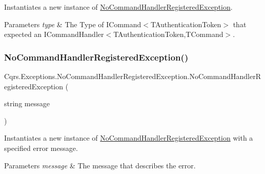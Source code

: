 Instantiates a new instance of \hyperlink{classCqrs_1_1Exceptions_1_1NoCommandHandlerRegisteredException}{No\+Command\+Handler\+Registered\+Exception}. 


\begin{DoxyParams}{Parameters}
{\em type} & The Type of I\+Command$<$\+T\+Authentication\+Token$>$ that expected an I\+Command\+Handler$<$\+T\+Authentication\+Token,\+T\+Command$>$.\\
\hline
\end{DoxyParams}
\mbox{\label{classCqrs_1_1Exceptions_1_1NoCommandHandlerRegisteredException_a489f12858f990ea6a84f268e7744ab84_a489f12858f990ea6a84f268e7744ab84}} 
\subsubsection{\texorpdfstring{No\+Command\+Handler\+Registered\+Exception()}{NoCommandHandlerRegisteredException()}\hspace{0.1cm}{\footnotesize\ttfamily [2/2]}}
{\footnotesize\ttfamily Cqrs.\+Exceptions.\+No\+Command\+Handler\+Registered\+Exception.\+No\+Command\+Handler\+Registered\+Exception (\begin{DoxyParamCaption}\item[{string}]{message }\end{DoxyParamCaption})\hspace{0.3cm}{\ttfamily [protected]}}



Instantiates a new instance of \hyperlink{classCqrs_1_1Exceptions_1_1NoCommandHandlerRegisteredException}{No\+Command\+Handler\+Registered\+Exception} with a specified error message. 


\begin{DoxyParams}{Parameters}
{\em message} & The message that describes the error.\\
\hline
\end{DoxyParams}
